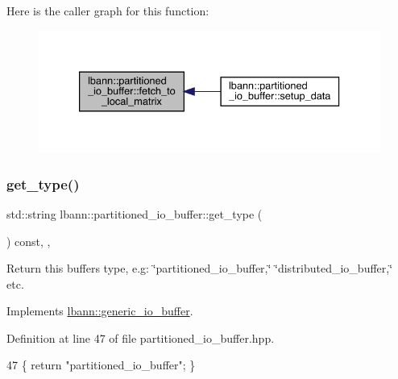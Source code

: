 Here is the caller graph for this function\+:\nopagebreak
\begin{figure}[H]
\begin{center}
\leavevmode
\includegraphics[width=333pt]{classlbann_1_1partitioned__io__buffer_a777719c9cebe912dc4c005e2c78d77c8_icgraph}
\end{center}
\end{figure}
\mbox{\label{classlbann_1_1partitioned__io__buffer_a55120307848cabf8ef12558594b4e9e5}} 
\subsubsection{\texorpdfstring{get\+\_\+type()}{get\_type()}}
{\footnotesize\ttfamily std\+::string lbann\+::partitioned\+\_\+io\+\_\+buffer\+::get\+\_\+type (\begin{DoxyParamCaption}{ }\end{DoxyParamCaption}) const\hspace{0.3cm}{\ttfamily [inline]}, {\ttfamily [override]}, {\ttfamily [virtual]}}

Return this buffer\textquotesingle{}s type, e.\+g\+: \char`\"{}partitioned\+\_\+io\+\_\+buffer,\char`\"{} \char`\"{}distributed\+\_\+io\+\_\+buffer,\char`\"{} etc. 

Implements \hyperlink{classlbann_1_1generic__io__buffer_adc77c0a280f8a200a8d8495c3a371ebb}{lbann\+::generic\+\_\+io\+\_\+buffer}.



Definition at line 47 of file partitioned\+\_\+io\+\_\+buffer.\+hpp.


\begin{DoxyCode}
47 \{ \textcolor{keywordflow}{return} \textcolor{stringliteral}{"partitioned\_io\_buffer"}; \}
\end{DoxyCode}
\mbox{\label{classlbann_1_1partitioned__io__buffer_a0944161f90eb65286974c3e85155608f}} 
